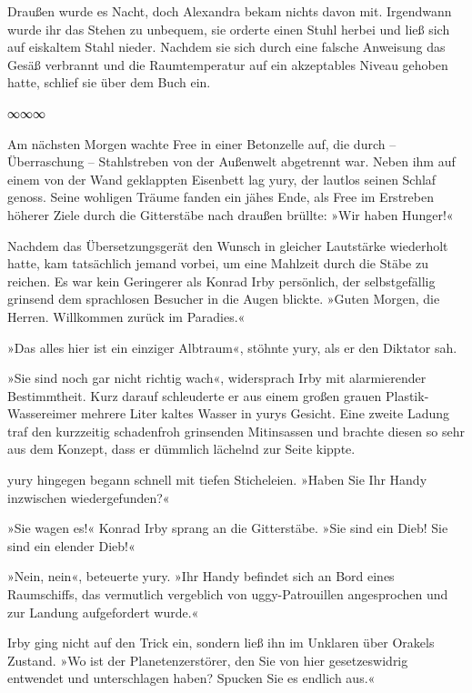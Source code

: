 Draußen wurde es Nacht, doch Alexandra bekam nichts davon mit. Irgendwann wurde ihr das Stehen zu unbequem, sie orderte einen Stuhl herbei und ließ sich auf eiskaltem Stahl nieder. Nachdem sie sich durch eine falsche Anweisung das Gesäß verbrannt und die Raumtemperatur auf ein akzeptables Niveau gehoben hatte, schlief sie über dem Buch ein.

\begin{center}
∞∞∞
\end{center}

Am nächsten Morgen wachte Free in einer Betonzelle auf, die durch – Überraschung – Stahlstreben von der Außenwelt abgetrennt war. Neben ihm auf einem von der Wand geklappten Eisenbett lag yury, der lautlos seinen Schlaf genoss. Seine wohligen Träume fanden ein jähes Ende, als Free im Erstreben höherer Ziele durch die Gitterstäbe nach draußen brüllte: »Wir haben Hunger!«

Nachdem das Übersetzungsgerät den Wunsch in gleicher Lautstärke wiederholt hatte, kam tatsächlich jemand vorbei, um eine Mahlzeit durch die Stäbe zu reichen. Es war kein Geringerer als Konrad Irby persönlich, der selbstgefällig grinsend dem sprachlosen Besucher in die Augen blickte. »Guten Morgen, die Herren. Willkommen zurück im Paradies.«

»Das alles hier ist ein einziger Albtraum«, stöhnte yury, als er den Diktator sah.

»Sie sind noch gar nicht richtig wach«, widersprach Irby mit alarmierender Bestimmtheit. Kurz darauf schleuderte er aus einem großen grauen Plastik-Wassereimer mehrere Liter kaltes Wasser in yurys Gesicht. Eine zweite Ladung traf den kurzzeitig schadenfroh grinsenden Mitinsassen und brachte diesen so sehr aus dem Konzept, dass er dümmlich lächelnd zur Seite kippte.

yury hingegen begann schnell mit tiefen Sticheleien. »Haben Sie Ihr Handy inzwischen wiedergefunden?«

»Sie wagen es!« Konrad Irby sprang an die Gitterstäbe. »Sie sind ein Dieb! Sie sind ein elender Dieb!«

»Nein, nein«, beteuerte yury. »Ihr Handy befindet sich an Bord eines Raumschiffs, das vermutlich vergeblich von uggy-Patrouillen angesprochen und zur Landung aufgefordert wurde.«

Irby ging nicht auf den Trick ein, sondern ließ ihn im Unklaren über Orakels Zustand. »Wo ist der Planetenzerstörer, den Sie von hier gesetzeswidrig entwendet und unterschlagen haben? Spucken Sie es endlich aus.«

